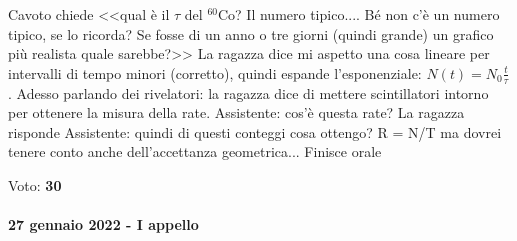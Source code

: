 \documentclass[../main.tex]{subfiles}
\begin{document}
\begin{itemize}
\begin{enumerate}
Cavoto chiede <<qual è il $\tau$ del $^{60}$Co? Il numero tipico.... Bé non c'è un numero tipico, se lo ricorda? Se fosse di un anno o tre giorni (quindi grande) un grafico più realista quale sarebbe?>> 
La ragazza dice mi aspetto una cosa lineare per intervalli di tempo minori (corretto), quindi espande l'esponenziale: \(N(t) = N_0\frac{t}{\tau}\).
Adesso parlando dei rivelatori: la ragazza dice di mettere scintillatori intorno per ottenere la misura della rate.
Assistente: cos'è questa rate?
La ragazza risponde
Assistente: quindi di questi conteggi cosa ottengo?
R = N/T ma dovrei tenere conto anche dell'accettanza geometrica... Finisce orale
\end{enumerate}
\end{itemize}
Voto: {\bf 30}
\paragraph{27 gennaio 2022 - I appello}
\end{document}
